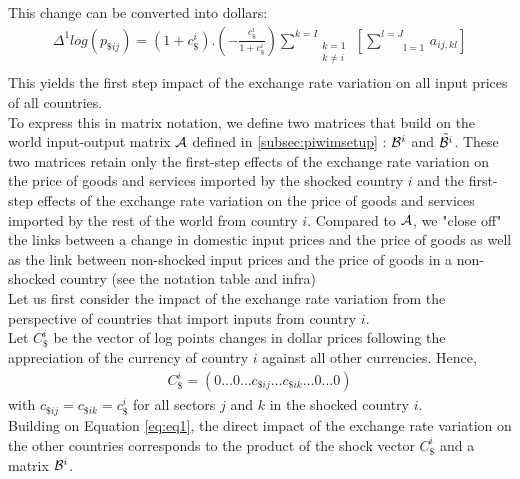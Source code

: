 \documentclass[11pt,a4paper]{paper} %
\begin{document}
This change can be converted into dollars: \\
\begin{eqnarray}
\Delta^1 log(p_{\$ij})=\left(1+c_\$^i\right).\left(-\frac{c_\$^i}{1+c_\$^i}\right)\underset{\begin{matrix}k=1\\k\neq i\\\end{matrix}}{\overset{{k}={I}}{\mathop\sum}}\,\left[\underset{\text{l}=1}{\overset{{l}={J}}{\mathop\sum}}\,{{{a}}_{ij,kl}}\right] 
\label{eq:eq2}
\end{eqnarray}
This yields the first step impact of the exchange rate variation on all input prices of all countries.\\
To express this in matrix notation, we define two matrices that build on the world input-output matrix $\cal A$ defined in \ref{subsec:piwimsetup} : ${{\cal B}^i}$ and ${\tilde{{\cal B}^i}}$. 
These two matrices retain only the first-step effects of the exchange rate variation on the price of goods and services imported by the shocked country $i$ and the first-step effects of the exchange rate variation on the price of goods and services imported by the rest of the world from country $i$. 
Compared to $\cal A$, we "close off" the links between a change in domestic input prices and the price of goods as well as the link between non-shocked input prices and the price of goods in a non-shocked country (see the notation table and infra)\\
Let us first consider the impact of the exchange rate variation from the perspective of countries that import inputs from country $i$.\\
Let $C_\$^i$ be the vector of log points changes in dollar prices following the 
appreciation of the currency of country $i$ against all other currencies.
Hence,
\begin{eqnarray*}
C_\$^i=\left(0\ldots0\ldots c_{\$ij}\ldots c_{\$ik}\dots 0\ldots0\right)
\end{eqnarray*}
with $c_{\$ij}=c_{\$ik}=c_\$^i
$
for all sectors $j$ and $k$ in the shocked country $i$.\\
Building on Equation \ref{eq:eq1}, the direct impact of the exchange rate variation on the other countries corresponds to the product of the shock vector $C_\$^i$ and a matrix ${\cal B}^i$. 
\end{document}
